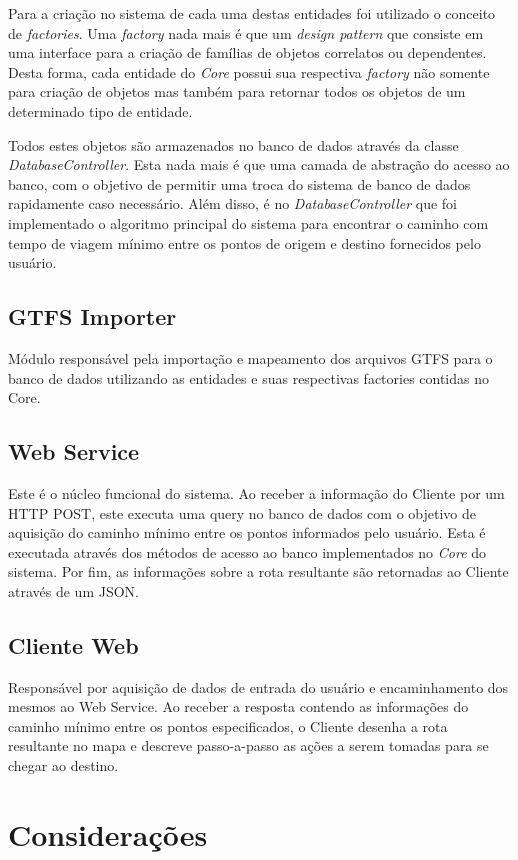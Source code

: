 Para a criação no sistema de cada uma destas entidades foi utilizado o conceito de \emph{factories}. 
Uma \emph{factory} nada mais é que um \emph{design pattern} que consiste em uma interface para a criação de famílias de objetos correlatos ou dependentes.
Desta forma, cada entidade do \emph{Core} possui sua respectiva \emph{factory} não somente para criação de objetos mas também para retornar todos os objetos de um determinado tipo de entidade.

Todos estes objetos são armazenados no banco de dados através da classe \emph{DatabaseController}.
Esta nada mais é que uma camada de abstração do acesso ao banco, com o objetivo de permitir uma troca do sistema de banco de dados rapidamente caso necessário.
Além disso, é no \emph{DatabaseController} que foi implementado o algoritmo principal do sistema para encontrar o caminho com tempo de viagem mínimo entre os pontos de origem e destino fornecidos pelo usuário.


\subsection{GTFS Importer}
Módulo responsável pela importação e mapeamento dos arquivos GTFS para o banco de dados utilizando as entidades e suas respectivas factories contidas no Core. 

\subsection{Web Service}
Este é o núcleo funcional do sistema.
Ao receber a informação do Cliente por um HTTP POST, este executa uma query no banco de dados com o objetivo de aquisição do caminho mínimo entre os pontos informados pelo usuário. 
Esta é executada através dos métodos de acesso ao banco implementados no \emph{Core} do sistema. 
Por fim, as informações sobre a rota resultante são retornadas ao Cliente através de um JSON.

\subsection{Cliente Web}
Responsável por aquisição de dados de entrada do usuário e encaminhamento dos mesmos ao Web Service. 
Ao receber a resposta contendo as informações do caminho mínimo entre os pontos especificados, o Cliente desenha a rota resultante no mapa e descreve passo-a-passo as ações a serem tomadas para se chegar ao destino.

\section{Considerações}

